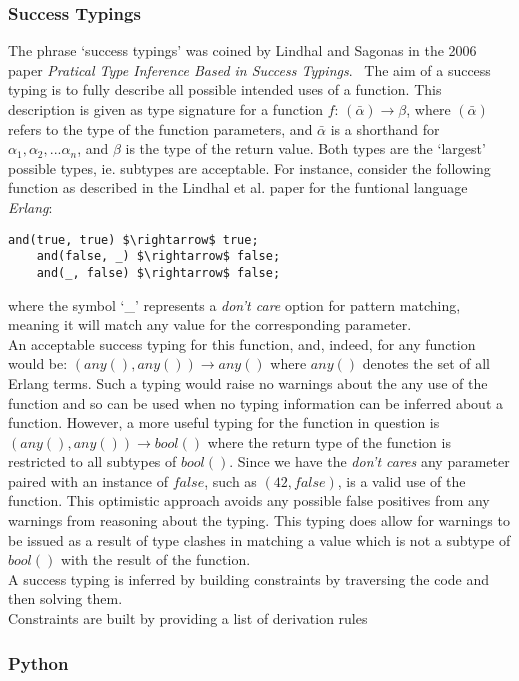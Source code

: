 \documentclass[12pt, titlepage]{article}
\begin{document}
\subsubsection*{Success Typings}
The phrase `success typings' was coined by Lindhal and Sagonas in the 2006 paper \textit{Pratical Type Inference Based in Success Typings}.~\cite{lindhal06} The aim of a success typing is to fully describe all possible intended uses of a function. This description is given as type signature for a function $f$: $(\bar{\alpha}) \rightarrow \beta$, where $(\bar{\alpha})$ refers to the type of the function parameters, and $\bar{\alpha}$ is a shorthand for $\alpha_1, \alpha_2,...\alpha_n$, and $\beta$ is the type of the return value. Both types are the `largest' possible types, ie. subtypes are acceptable. For instance, consider the following function as described in the Lindhal et al. paper for the funtional language \textit{Erlang}:
\begin{lstlisting}[mathescape]
	and(true, true) $\rightarrow$ true;
	and(false, _) $\rightarrow$ false;
	and(_, false) $\rightarrow$ false;
\end{lstlisting}
where the symbol `\_' represents a \textit{don't care} option for pattern matching, meaning it will match any value for the corresponding parameter. \\
An acceptable success typing for this function, and, indeed, for any function would be: $(any(), any()) \rightarrow any()$ where $any()$ denotes the set of all Erlang terms. Such a typing would raise no warnings about the any use of the function and so can be used when no typing information can be inferred about a function. However, a more useful typing for the function in question is $(any(), any()) \rightarrow bool()$ where the return type of the function is restricted to all subtypes of $bool()$. Since we have the \textit{don't cares} any parameter paired with an instance of $false$, such as $(42, false)$, is a valid use of the function. This optimistic approach avoids any possible false positives from any warnings from reasoning about the typing. This typing does allow for warnings to be issued as a result of type clashes in matching a value which is not a subtype of $bool()$ with the result of the function. \\
A success typing is inferred by building constraints by traversing the code and then solving them. \\
Constraints are built by providing a list of derivation rules

\subsubsection*{Python}
\end{document}
